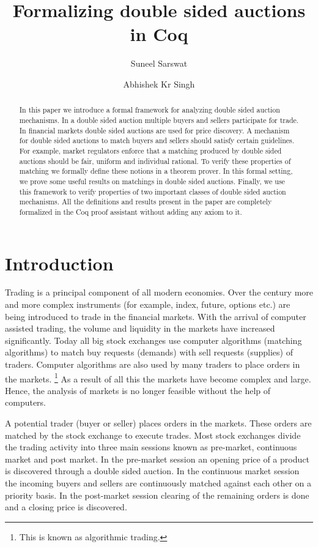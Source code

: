 \documentclass[a4paper,UKenglish,cleveref, autoref]{lipics-v2019}
\title{Formalizing double sided auctions in Coq} %
\author{Suneel Sarswat}{Tata Institute of Fundamental Research, India} {suneel.sarswat@gmail.com}
{}{}
\author{Abhishek Kr Singh}{Tata Institute of Fundamental Research, India} {abhishek.uor@gmail.com}
{}{}
\begin{document}
\newcommand{\tw}{\texttt}

\maketitle

\begin{abstract}


In this paper we introduce a formal framework for analyzing double sided auction mechanisms. In a
double sided auction multiple buyers and sellers participate for trade.
In financial markets double sided auctions are used for price discovery. A mechanism for double
sided auctions to match buyers and sellers should satisfy certain guidelines.
For example, market regulators enforce that a matching produced by double sided auctions should 
be fair, uniform and individual rational. To verify these properties of matching we formally define these notions
in a theorem prover. 
In this formal setting, we prove some useful results on matchings in double sided
auctions. Finally, we use this framework to verify properties of two important classes of double
sided auction mechanisms. All the definitions and results present in the paper are completely formalized in
the Coq proof assistant without adding any axiom to it. 
\end{abstract}

\section{Introduction}
\label{section1}

Trading is a principal component of all modern economies. Over the century more and more
complex instruments (for example, index, future, options etc.) are being introduced to
trade in the financial markets. With the arrival of computer assisted trading, the volume
and liquidity in the markets have increased significantly. Today all big stock exchanges
use computer algorithms (matching algorithms) to match buy requests (demands) with sell
requests (supplies) of traders. Computer algorithms are also used by many traders to place
orders in the markets. \footnote{This is known as algorithmic trading.} As a result of all this the
markets have become complex and large. Hence, the analysis of markets is no longer feasible
without the help of computers. 

A potential trader (buyer or seller) places orders in the markets. These orders are matched by the stock exchange to execute trades. Most stock exchanges divide the trading activity into three main sessions known as pre-market, continuous market and post market. In the pre-market session an opening price of a product is discovered through a double sided auction. In the continuous market session the incoming buyers and sellers are continuously matched against each other on a priority basis. In the post-market session clearing of the remaining orders is done and a closing price is discovered.
\end{document}
